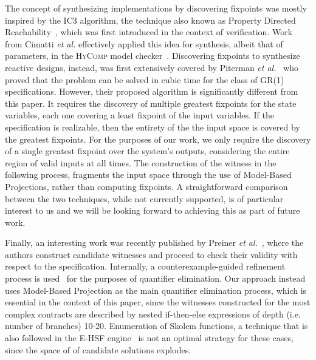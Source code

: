 The concept of synthesizing implementations by discovering fixpoints was mostly
inspired by the IC3 algorithm, the technique also known as Property Directed
Reachability~\cite{bradley2011sat,een2011efficient}, which was first introduced
in the context of verification. Work from Cimatti \textit{et al.} effectively
applied this idea for synthesis, albeit that of parameters, in the
\textsc{HyComp} model checker~\cite{DBLP:conf/fmcad/CimattiGMT13, cimatti2015hycomp}.
Discovering fixpoints to synthesize reactive designs, instead, was first
extensively covered by Piterman \textit{et al.}~\cite{piterman2006synthesis}
who proved that the problem can be solved in cubic time for the class of GR(1) specifications.
However, their proposed algorithm is significantly different from this paper. It
requires the discovery of multiple greatest fixpoints for the state variables,
each one covering a least fixpoint of the input variables. If the specification
is realizable, then the entirety of the the input space is covered by the greatest fixpoints. For the purposes of our work, we only require the discovery of a single greatest fixpoint over the system's outputs, considering
the entire region of valid inputs at all times. The construction of the witness
in the following process, fragments the input space through the use of Model-Based Projections, rather than computing fixpoints.
A straightforward comparison between the two techniques, while not currently
supported, is of particular interest to us and we will be looking forward to
achieving this as part of future work.

Finally, an interesting work was recently published by Preiner \textit{et
al.}~\cite{preiner2017counterexample}, where the authors construct candidate
witnesses and proceed to check their validity with respect to the specification.
Internally, a counterexample-guided refinement process is
used~\cite{reynolds2015counterexample} for the purposes of quantifier
elimination. Our approach instead uses Model-Based Projection as the main
quantifier elimination process, which is essential in the context of this paper,
since the witnesses constructed for the most complex contracts are described by
nested if-then-else expressions of depth (i.e. number of branches) 10-20.
Enumeration of Skolem functions, a technique that is also followed in the E-HSF
engine~\cite{beyene2014constraint} is not an optimal strategy for these cases,
since the space of of candidate solutions explodes.


